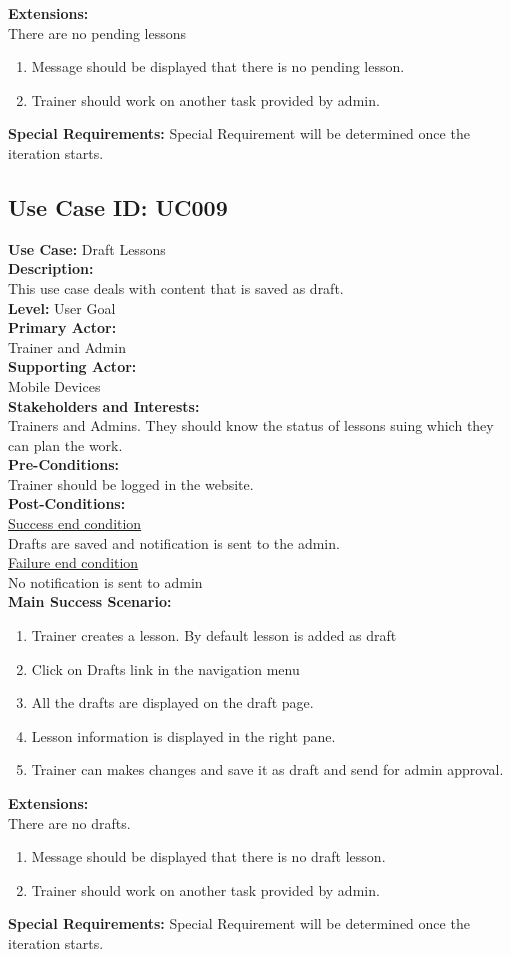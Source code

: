 \documentclass{report}
\begin{document}
\textbf{Extensions:}\\
There are no pending lessons
\begin{enumerate}
    \item Message should be displayed that there is no pending lesson.
    \item Trainer should work on another task provided by admin.
\end{enumerate}
\textbf{Special Requirements:}
Special Requirement will be determined once the iteration starts.

\subsection{\textbf{Use Case ID:} UC009}
\textbf{Use Case:} Draft Lessons\\[0.3cm]
\textbf{Description:}\\
This use case deals with content that is saved as draft.\\[0.3cm]
\textbf{Level:} User Goal\\[0.3cm]
\textbf{Primary Actor:}\\
Trainer and Admin\\[0.3cm]
\textbf{Supporting Actor:}\\
Mobile Devices\\[0.3cm]
\textbf{Stakeholders and Interests:}\\
Trainers and Admins. They should know the status of lessons suing which they can plan the work.\\[0.3cm]
\textbf{Pre-Conditions:}\\
Trainer should be logged in the website.\\[0.3cm]
\textbf{Post-Conditions:}\\
\underline{Success end condition}\\
Drafts are saved and notification is sent to the admin.\\[0.3cm]
\underline{Failure end condition}\\
No notification is sent to admin\\[0.3cm]
\textbf{\large {Main Success Scenario:}}
\begin{enumerate}
    \item Trainer creates a lesson. By default lesson is added as draft
    \item Click on Drafts link in the navigation menu
    \item All the drafts are displayed on the draft page.
    \item Lesson information is displayed in the right pane.
    \item Trainer can makes changes and save it as draft and send for admin approval.
\end{enumerate}
\textbf{Extensions:}\\
There are no drafts.
\begin{enumerate}
    \item Message should be displayed that there is no draft lesson.
    \item Trainer should work on another task provided by admin.
\end{enumerate}
\textbf{Special Requirements:}
Special Requirement will be determined once the iteration starts.
\end{document}
